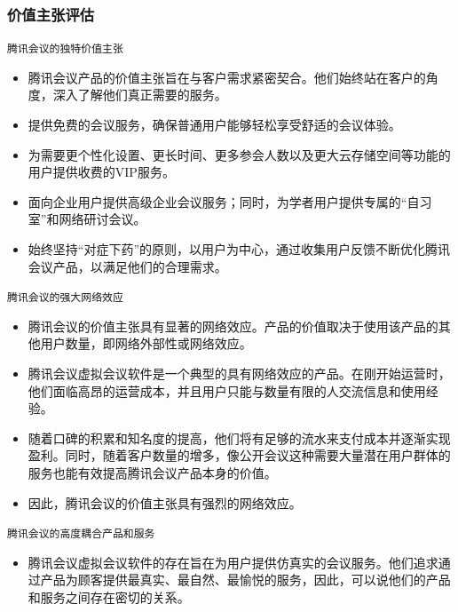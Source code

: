 \documentclass[a4paper,12pt]{article}
\begin{document}
    \subsubsection{价值主张评估}
    \texttt{腾讯会议的独特价值主张}

\begin{itemize}
  \item 腾讯会议产品的价值主张旨在与客户需求紧密契合。他们始终站在客户的角度，深入了解他们真正需要的服务。
  
  \item 提供免费的会议服务，确保普通用户能够轻松享受舒适的会议体验。
  
  \item 为需要更个性化设置、更长时间、更多参会人数以及更大云存储空间等功能的用户提供收费的VIP服务。
  
  \item 面向企业用户提供高级企业会议服务；同时，为学者用户提供专属的“自习室”和网络研讨会议。
  
  \item 始终坚持“对症下药”的原则，以用户为中心，通过收集用户反馈不断优化腾讯会议产品，以满足他们的合理需求。
\end{itemize}

\texttt{腾讯会议的强大网络效应}

\begin{itemize}
  \item 腾讯会议的价值主张具有显著的网络效应。产品的价值取决于使用该产品的其他用户数量，即网络外部性或网络效应。
  
  \item 腾讯会议虚拟会议软件是一个典型的具有网络效应的产品。在刚开始运营时，他们面临高昂的运营成本，并且用户只能与数量有限的人交流信息和使用经验。
  
  \item 随着口碑的积累和知名度的提高，他们将有足够的流水来支付成本并逐渐实现盈利。同时，随着客户数量的增多，像公开会议这种需要大量潜在用户群体的服务也能有效提高腾讯会议产品本身的价值。
  
  \item 因此，腾讯会议的价值主张具有强烈的网络效应。
\end{itemize}

\texttt{腾讯会议的高度耦合产品和服务}

\begin{itemize}
  \item 腾讯会议虚拟会议软件的存在旨在为用户提供仿真实的会议服务。他们追求通过产品为顾客提供最真实、最自然、最愉悦的服务，因此，可以说他们的产品和服务之间存在密切的关系。
\end{itemize}
\end{document}
